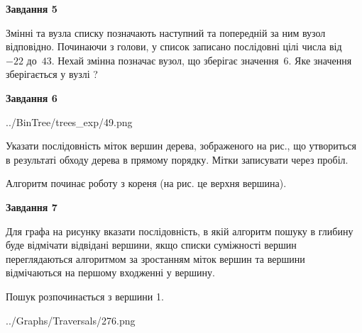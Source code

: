 \documentclass[12pt, ukrainian]{article}
\begin{document}
{\begin {large}
{\begin {center}\textbf{Завдання 5}\end {center}}\par
Змінні  та  вузла списку позначають наступний та попередній за ним вузол відповідно. Починаючи з голови, у список записано послідовні цілі числа від~$-22$ до~$43$. Нехай змінна  позначає вузол, що зберігає значення~$6$.
Яке значення зберігається у вузлі  ?\par
\newpage

{\begin {center}\textbf{Завдання 6}\end {center}}\par

\begin{center}
	{../BinTree/trees_exp/49.png}
\end{center}
Указати послідовність міток вершин дерева, зображеного на рис., що утвориться в результаті обходу дерева в прямому порядку. Мітки записувати через пробіл.\par Алгоритм починає роботу з кореня (на рис. це верхня вершина).\par
\newpage

{\begin {center}\textbf{Завдання 7}\end {center}}\par
Для графа на рисунку вказати послідовність, в якій алгоритм пошуку в глибину буде відмічати відвідані вершини, якщо списки суміжності вершин переглядаються алгоритмом за зростанням міток вершин та вершини відмічаються на першому вход\-женні у вершину.\par
Пошук розпочинається з вершини 1.\par

\begin{center}
	{../Graphs/Traversals/276.png}
\end{center}\par
\newpage


\end{large}}
\end{document}
